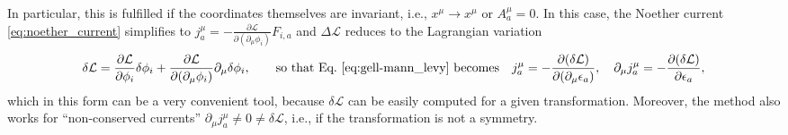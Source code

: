 \documentclass[11pt]{latex/exercise}
\begin{document}
In particular, this is fulfilled if the coordinates themselves are invariant, i.e., $x^\mu \rightarrow x^\mu$ or $A_a^\mu = 0$.
In this case, the Noether current \eqref{eq:noether_current} simplifies to $j^\mu_a = -\frac{\partial \mathcal{L}}{\partial (\partial_\mu \phi_i)} F_{i,a}$ and $\Delta \mathcal{L}$ reduces to the Lagrangian variation
\begin{align}
    \delta \mathcal{L} = \frac{\partial \mathcal{L}}{\partial \phi_i} \delta \phi_i + \frac{\partial \mathcal{L}}{\partial(\partial_\mu \phi_i)} \partial_\mu \delta \phi_i,
    \qquad \text{so that Eq.~\eqref{eq:gell-mann_levy} becomes} \quad
    j^\mu_a = -\frac{\partial(\delta \mathcal{L})}{\partial(\partial_\mu \epsilon_a)},\quad
    \partial_\mu j^\mu_a = -\frac{\partial(\delta \mathcal{L})}{\partial \epsilon_a} ,
\end{align}
which in this form can be a very convenient tool, because $\delta \mathcal{L}$ can be easily computed for a given transformation. Moreover, the method also works for ``non-conserved currents'' $\partial_\mu j^\mu_a \neq 0 \neq \delta \mathcal{L}$, i.e., if the transformation is not a symmetry.
\end{document}
